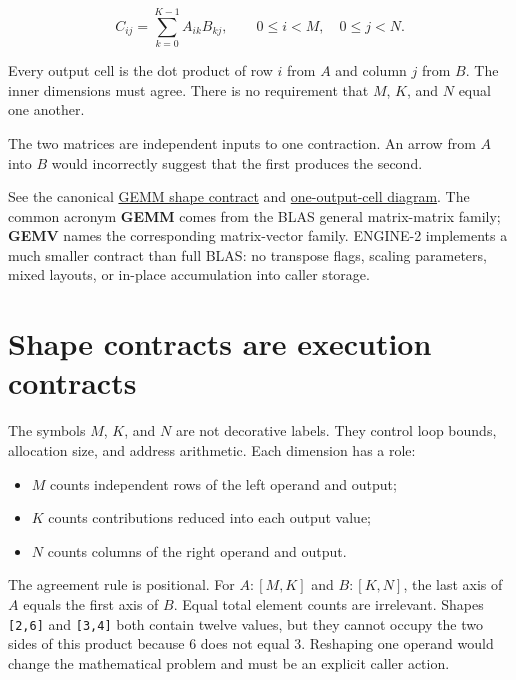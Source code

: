 \begin{equation}
C_{ij}=\sum_{k=0}^{K-1}A_{ik}B_{kj},
\qquad 0\le i<M,\quad 0\le j<N.
\end{equation}

Every output cell is the dot product of row \(i\) from \(A\) and column
\(j\) from \(B\). The inner dimensions must agree. There is no
requirement that \(M\), \(K\), and \(N\) equal one another.

The two matrices are independent inputs to one contraction. An arrow
from \(A\) into \(B\) would incorrectly suggest that the first produces
the second.

See the canonical
\href{https://github.com/hermonai/inside-the-llm-engine/blob/astra-visual-rewrite/diagrams/linear/gemm-shape-contract.txt}{GEMM
shape contract} and
\href{https://github.com/hermonai/inside-the-llm-engine/blob/astra-visual-rewrite/diagrams/linear/gemm-one-output-cell.txt}{one-output-cell
diagram}. The common acronym \textbf{GEMM} comes from the BLAS general
matrix-matrix family; \textbf{GEMV} names the corresponding
matrix-vector family. ENGINE-2 implements a much smaller contract than
full BLAS: no transpose flags, scaling parameters, mixed layouts, or
in-place accumulation into caller storage.

\section{Shape contracts are execution
contracts}\label{shape-contracts-are-execution-contracts}

The symbols \(M\), \(K\), and \(N\) are not decorative labels. They
control loop bounds, allocation size, and address arithmetic. Each
dimension has a role:

\begin{itemize}
\tightlist
\item
  \(M\) counts independent rows of the left operand and output;
\item
  \(K\) counts contributions reduced into each output value;
\item
  \(N\) counts columns of the right operand and output.
\end{itemize}

The agreement rule is positional. For \(A:[M,K]\) and \(B:[K,N]\), the
last axis of \(A\) equals the first axis of \(B\). Equal total element
counts are irrelevant. Shapes \texttt{{[}2,6{]}} and \texttt{{[}3,4{]}}
both contain twelve values, but they cannot occupy the two sides of this
product because 6 does not equal 3. Reshaping one operand would change
the mathematical problem and must be an explicit caller action.

